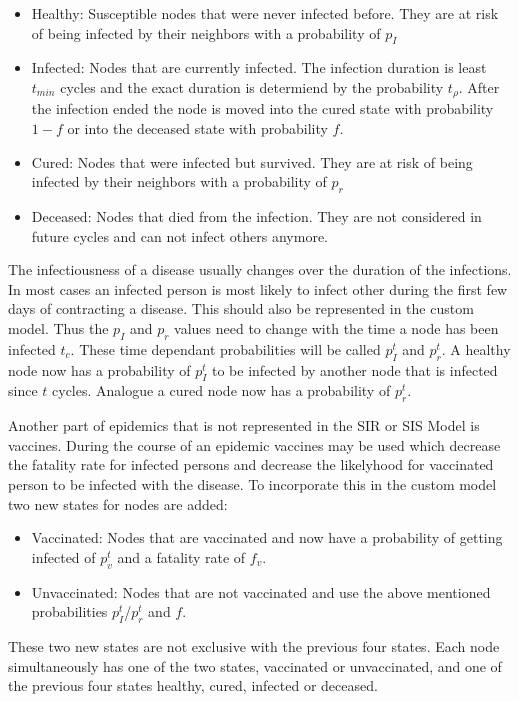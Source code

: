 \begin{itemize}
    \item Healthy: Susceptible nodes that were never infected before. They are at risk of being
    infected by their neighbors with a probability of $p_I$
    \item Infected: Nodes that are currently infected. The infection duration is least $t_{min}$ cycles and
    the exact duration is determiend by the probability $t_\rho$. After the infection ended the
    node is moved into the cured state with probability $1-f$ or into the deceased state with
    probability $f$.
    \item Cured: Nodes that were infected but survived. They are at risk of being
    infected by their neighbors with a probability of $p_r$ 
    \item Deceased: Nodes that died from the infection. They are not considered in future cycles
    and can not infect others anymore.
\end{itemize}

The infectiousness of a disease usually changes over the duration of the infections. In most
cases an infected person is most likely to infect other during the first few days of contracting
a disease. This should also be represented in the custom model. Thus the $p_I$ and $p_r$ values
need to change with the time a node has been infected $t_c$. These time dependant probabilities
will be called $p_I^t$ and $p_r^t$. A healthy node now has a probability of $p_I^t$ to
be infected by another node that is infected since $t$ cycles. Analogue a cured node 
now has a probability of $p_r^t$.

Another part of epidemics that is not represented in the SIR or SIS Model is vaccines.
During the course of an epidemic vaccines may be used which decrease the fatality rate
for infected persons and decrease the likelyhood for vaccinated person to be infected with
the disease. To incorporate this in the custom model two new states for nodes are added:
\begin{itemize}
    \item Vaccinated: Nodes that are vaccinated and now have a probability of getting infected
    of $p_v^t$ and a fatality rate of $f_v$.
    \item Unvaccinated: Nodes that are not vaccinated and use the above mentioned probabilities
    $p_I^t$/$p_r^t$ and $f$.
\end{itemize}
These two new states are not exclusive with the previous four states. Each node simultaneously
has one of the two states, vaccinated or unvaccinated, and one of the previous four states 
healthy, cured, infected or deceased.

